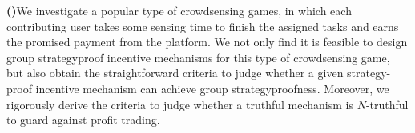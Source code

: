 \documentclass[conference]{IEEEtran}
\theoremstyle{definition}
\begin{document}
\newcount\itemcount
{}\relax
\def\bolditem{\par{\bf(\the\itemcount)}\enspace\advance{}\relax}

\bolditem We investigate a popular type of crowdsensing games, in which each contributing user takes some sensing time to finish the assigned tasks and earns the promised payment from the platform. We not only find it is feasible to design group strategyproof incentive mechanisms for this type of crowdsensing game, but also obtain the straightforward criteria to judge whether a given strategy-proof incentive mechanism can achieve group strategyproofness. Moreover, we rigorously derive the criteria to judge whether a truthful mechanism is $N$-truthful to guard against profit trading. %
\end{document}

